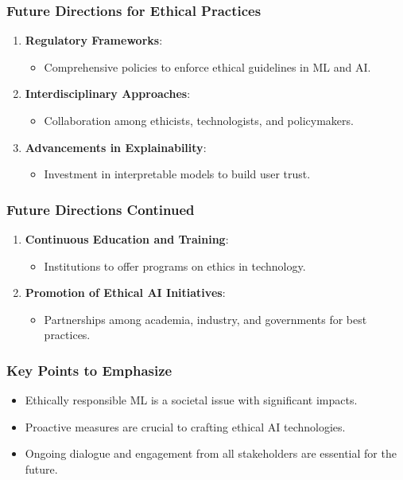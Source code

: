 \documentclass[aspectratio=169]{beamer}
\begin{document}
\begin{frame}[fragile]
    \frametitle{Future Directions for Ethical Practices}
    \begin{enumerate}
        \item \textbf{Regulatory Frameworks}:
        \begin{itemize}
            \item Comprehensive policies to enforce ethical guidelines in ML and AI.
        \end{itemize}

        \item \textbf{Interdisciplinary Approaches}:
        \begin{itemize}
            \item Collaboration among ethicists, technologists, and policymakers.
        \end{itemize}

        \item \textbf{Advancements in Explainability}:
        \begin{itemize}
            \item Investment in interpretable models to build user trust.
        \end{itemize}
    \end{enumerate}
\end{frame}

\begin{frame}[fragile]
    \frametitle{Future Directions Continued}
    \begin{enumerate}
        \item \textbf{Continuous Education and Training}:
        \begin{itemize}
            \item Institutions to offer programs on ethics in technology.
        \end{itemize}

        \item \textbf{Promotion of Ethical AI Initiatives}:
        \begin{itemize}
            \item Partnerships among academia, industry, and governments for best practices.
        \end{itemize}
    \end{enumerate}
\end{frame}

\begin{frame}[fragile]
    \frametitle{Key Points to Emphasize}
    \begin{itemize}
        \item Ethically responsible ML is a societal issue with significant impacts.
        \item Proactive measures are crucial to crafting ethical AI technologies.
        \item Ongoing dialogue and engagement from all stakeholders are essential for the future.
    \end{itemize}
\end{frame}
\end{document}
